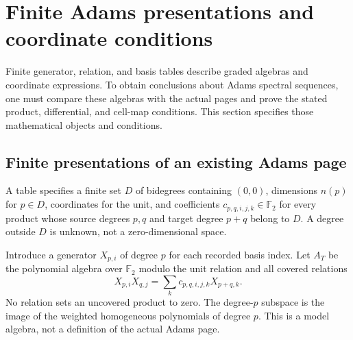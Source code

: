 \section{Finite Adams presentations and coordinate conditions}
\label{chap:computation-schema}

Finite generator, relation, and basis tables describe graded algebras and
coordinate expressions. To obtain conclusions about Adams spectral sequences,
one must compare these algebras with the actual pages and prove the stated
product, differential, and cell-map conditions. This section specifies those
mathematical objects and conditions.

\subsection{Finite presentations of an existing Adams page}

\begin{definition}
  \label{def:adams-e2-basis-table}
  \leanok
  A table specifies a finite set $D$ of bidegrees containing $(0,0)$,
  dimensions $n(p)$ for $p\in D$, coordinates for the unit, and coefficients
  $c_{p,q,i,j,k}\in\mathbb F_2$ for every product whose source degrees
  $p,q$ and target degree $p+q$ belong to $D$.
  A degree outside $D$ is unknown, not a zero-dimensional space.
\end{definition}

\begin{definition}
  \label{def:adams-e2-table-model}
  \leanok
  Introduce a generator $X_{p,i}$ of degree $p$ for each recorded basis
  index.  Let $A_T$ be the polynomial algebra over $\mathbb F_2$ modulo
  the unit relation and all covered relations
  \[
    X_{p,i}X_{q,j}=\sum_k c_{p,q,i,j,k}X_{p+q,k}.
  \]
  No relation sets an uncovered product to zero.  The degree-$p$ subspace
  is the image of the weighted homogeneous polynomials of degree $p$.
  This is a model algebra, not a definition of the actual Adams page.
\end{definition}

